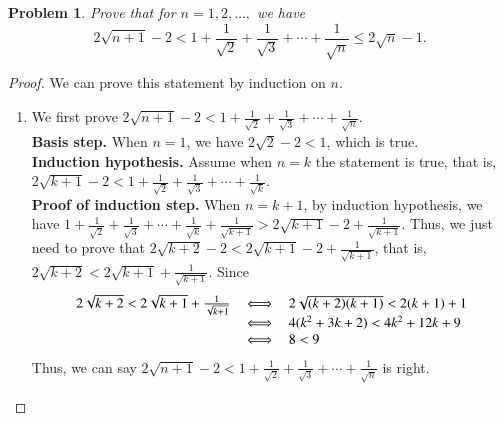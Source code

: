 \documentclass[12pt]{article}
\newtheorem{hw}{Problem}
\begin{document}
\begin{hw} Prove that for $n=1,2,\ldots,$ we have
\[
2\sqrt{n+1}-2<1+\frac{1}{\sqrt{2}}+\frac{1}{\sqrt{3}}+\cdots +\frac{1}{\sqrt{n}}\leq 2\sqrt{n}-1.
\]
\end{hw}
\begin{proof}
	We can prove this statement by induction on $n$.
	\begin{enumerate}
		\item \label{c1} We first prove $2\sqrt{n+1}-2<1+\frac{1}{\sqrt{2}}+\frac{1}{\sqrt{3}}+\cdots +\frac{1}{\sqrt{n}}$.\\
		\textbf{Basis step.} When $n = 1$, we have $2\sqrt{2} - 2 < 1$, which is true.\\
		\textbf{Induction hypothesis.} Assume when $n = k$ the statement is true, that is, $2\sqrt{k+1}-2<1+\frac{1}{\sqrt{2}}+\frac{1}{\sqrt{3}}+\cdots +\frac{1}{\sqrt{k}}$.\\
		\textbf{Proof of induction step.} When $n = k+1$, by induction hypothesis, we have $1+\frac{1}{\sqrt{2}}+\frac{1}{\sqrt{3}}+\cdots +\frac{1}{\sqrt{k}} + \frac{1}{\sqrt{k+1}} > 2\sqrt{k+1}-2 + \frac{1}{\sqrt{k+1}}$. Thus, we just need to prove that $2\sqrt{k+2}-2 < 2\sqrt{k+1}-2 + \frac{1}{\sqrt{k+1}}$, that is, $2\sqrt{k+2} < 2\sqrt{k+1} + \frac{1}{\sqrt{k+1}}$. Since 
		\begin{displaymath}
			\begin{tabular}{lcl}
				$2\sqrt{k+2} < 2\sqrt{k+1} + \frac{1}{\sqrt{k+1}}$ & $\Longleftrightarrow$ & $2\sqrt{(k+2)(k+1)} < 2(k+1) +1$ \\ 
				 & $\Longleftrightarrow$ & $4(k^2 + 3k +2) < 4k^2 + 12k + 9$ \\
				 & $\Longleftrightarrow$ & $8 < 9$
			\end{tabular}
		\end{displaymath}
		Thus, we can say $2\sqrt{n+1}-2<1+\frac{1}{\sqrt{2}}+\frac{1}{\sqrt{3}}+\cdots +\frac{1}{\sqrt{n}}$ is right.
		

\end{enumerate}
\end{proof}
\end{document}
